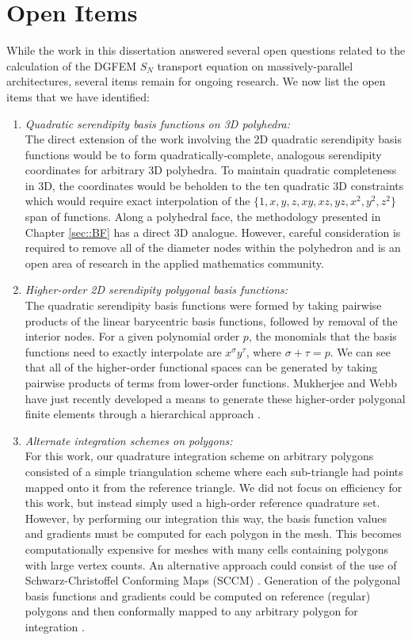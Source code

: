 \section{Open Items}
\label{sec::Conclusions_Open_Items}

While the work in this dissertation answered several open questions related to the calculation of the DGFEM $S_N$ transport equation on massively-parallel architectures, several items remain for ongoing research. We now list the open items that we have identified:

\begin{enumerate}
\item {\em Quadratic serendipity basis functions on 3D polyhedra:} \\
The direct extension of the work involving the 2D quadratic serendipity basis functions would be to form quadratically-complete, analogous serendipity coordinates for arbitrary 3D polyhedra. To maintain quadratic completeness in 3D, the coordinates would be beholden to the ten quadratic 3D constraints which would require exact interpolation of the $\{ 1,x,y,z,xy,xz,yz,x^2,y^2,z^2 \}$ span of functions. Along a polyhedral face, the methodology presented in Chapter \ref{sec::BF} has a direct 3D analogue. However, careful consideration is required to remove all of the diameter nodes within the polyhedron and is an open area of research in the applied mathematics community.
\item {\em Higher-order 2D serendipity polygonal basis functions:} \\
The quadratic serendipity basis functions were formed by taking pairwise products of the linear barycentric basis functions, followed by removal of the interior nodes. For a given polynomial order $p$, the monomials that the basis functions need to exactly interpolate are $x^\sigma y^\tau$, where $\sigma + \tau = p$. We can see that all of the higher-order functional spaces can be generated by taking pairwise products of terms from lower-order functions. Mukherjee and Webb have just recently developed a means to generate these higher-order polygonal finite elements through a hierarchical approach \cite{mukherjee2015hierarchical}.
\item {\em Alternate integration schemes on polygons:} \\
For this work, our quadrature integration scheme on arbitrary polygons consisted of a simple triangulation scheme where each sub-triangle had points mapped onto it from the reference triangle. We did not focus on efficiency for this work, but instead simply used a high-order reference quadrature set. However, by performing our integration this way, the basis function values and gradients must be computed for each polygon in the mesh. This becomes computationally expensive for meshes with many cells containing polygons with large vertex counts. An alternative approach could consist of the use of Schwarz-Christoffel Conforming Maps (SCCM) \cite{driscoll2002schwarz,driscoll2005algorithm}. Generation of the polygonal basis functions and gradients could be computed on reference (regular) polygons and then conformally mapped to any arbitrary polygon for integration \cite{natarajan2009numerical}.

\end{enumerate}
